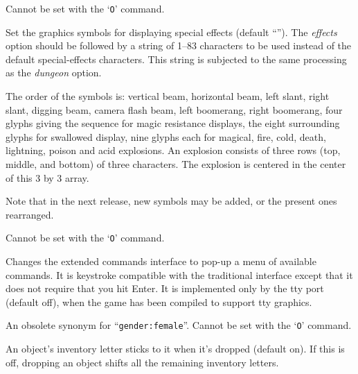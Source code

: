 Cannot be set with the `{\tt O}' command.

\item[\ib{effects}]
Set the graphics symbols for displaying special effects
(default \relax{}``'').
The
{\it effects\/} 
option should be followed by a string of 1--83
characters to be used instead of the default special-effects characters.
This string is subjected to the same processing as the
{\it dungeon\/} 
option.

The order of the symbols is:  vertical beam, horizontal beam, left slant,
right slant, digging beam, camera flash beam, left boomerang, right boomerang,
four glyphs giving the sequence for magic resistance displays,
the eight surrounding glyphs for swallowed display,
nine glyphs each for magical, fire, cold, death, lightning, poison and acid explosions.
An explosion consists of three rows (top, middle, and bottom) of three
characters.  The explosion is centered in the center of this 3 by 3
array.

Note that in the next release, new symbols may be added,
or the present ones rearranged.

Cannot be set with the `{\tt O}' command.

\item[\ib{extmenu}]
Changes the extended commands interface to pop-up a menu of available commands.  
It is keystroke compatible with the traditional interface except that it does
not require that you hit Enter. It is implemented only by the tty port 
(default off), when the game has been compiled to support tty graphics.

\item[\ib{female}]
An obsolete synonym for ``{\tt gender:female}''.
Cannot be set with the `{\tt O}' command.

\item[\ib{fixinv}]
An object's inventory letter sticks to it when it's dropped (default on).
If this is off, dropping an object shifts all the remaining inventory letters.


